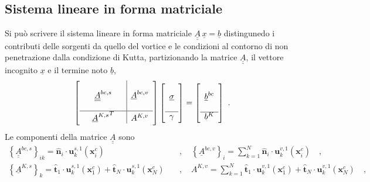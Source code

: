 \subsection{Sistema lineare in forma matriciale}
Si può scrivere il sistema lineare in forma matriciale $\underline{\underline{A}}\,\underline{x} = \underline{b}$ distingunedo i contributi delle sorgenti da quello del vortice e le condizioni al contorno di non penetrazione dalla condizione di Kutta, partizionando la matrice ${\underline{\underline{A}}}$, il vettore incognito $\underline{x}$ e il termine noto $\underline{b}$,
\begin{equation}
\left[
\begin{array}{ccc|c}
 & & & \\ 
 & {\underline{\underline{A}}}^{bc,s} & & \underline{A}^{bc,v} \\ 
 & & & \\ \hline  
 & {\underline{A}^{K,s}}^T & & A^{K,v} \vspace{0.1cm} \\
\end{array} \right]
\left[
\begin{array}{c}
 \\
 \underline{\sigma} \\
 \\
 \hline
 \gamma \vspace{0.1cm} \\
\end{array}
\right] =
\left[
\begin{array}{c}
 \\
 \underline{b}^{bc} \\
 \\
 \hline
 b^{K} \vspace{0.1cm} \\
\end{array}
\right] \ .
\end{equation}
Le componenti della matrice $\underline{\underline{A}}$ sono
\begin{equation}
\begin{aligned}
 \left\{ {\underline{\underline{A}}}^{bc,s}  \right\}_{ik} =
      \bm{\hat{n}}_i \cdot \bm{u}^{s,1}_k(\bm{x}^c_i) \quad & , \quad
 \left\{ {          {\underline{A}}}^{bc,v}  \right\}_{i} =
      \displaystyle\sum_{k=1}^{N}\bm{\hat{n}}_i \cdot \bm{u}^{v,1}_k(\bm{x}^c_i) \quad , \\
 \left\{ {          {\underline{A}}}^{K,s}  \right\}_{k} =
      \bm{\hat{t}}_1 \cdot \bm{u}^{s,1}_k(\bm{x}^c_1) +
      \bm{\hat{t}}_N \cdot \bm{u}^{s,1}_k(\bm{x}^c_N) 
      \quad & , \quad
         {          {          {A}}}^{K,v} =
     \displaystyle\sum_{k=1}^{N}
      \bm{\hat{t}}_1 \cdot \bm{u}^{v,1}_k(\bm{x}^c_1) +
      \bm{\hat{t}}_N \cdot \bm{u}^{v,1}_k(\bm{x}^c_N) 
      \quad ,
\end{aligned}
\end{equation}
